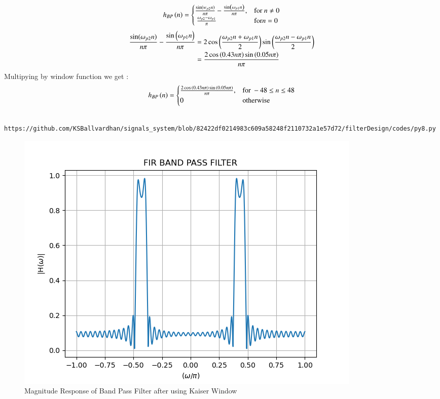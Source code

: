 \documentclass{article}
\begin{document}
	\begin{align}
		h_{BP}\left(n\right) = 
		\begin{cases} 
			\frac{\sin(w_{p2} n)}{n\pi} -\frac{\sin\left(\omega_{p1}n\right)}{n\pi},  & \text{for } n\neq 0\\\
			\frac{\omega_{p2}-\omega_{p1}}{\pi} &\text{for} n= 0
		\end{cases} \label{eq:h(n)desired_for_LPF}
	\end{align}
	\begin{align}
		\frac{\sin(\omega_{p2} n)}{n\pi} -\frac{\sin\left(\omega_{p1}n\right)}{n\pi} &= 2\cos{\ensuremath{\left(\frac{\omega_{p2}n+\omega_{p1}n}{2}\right)}}\sin{\ensuremath{\left(\frac{\omega_{p2}n-\omega_{p1}n}{2}\right)}}\\
		&= \frac{2\cos{\ensuremath{\left(0.43n\pi\right)}}\sin{\ensuremath{\left(0.05n\pi\right)}}}{n\pi}
	\end{align}
	Multipying by window function we get :
	\begin{align}
		h_{BP}\left(n\right) = 
		\begin{cases} 
			\frac{2\cos{\ensuremath{\left(0.43n\pi\right)}}\sin{\ensuremath{\left(0.05n\pi\right)}}}{n\pi},  & \text{for } -48\leq n \leq 48 \\
			0 &\text{otherwise}
		\end{cases} \label{eq:h(n)desired_for_LPF}
	\end{align}
	\begin{lstlisting}
		https://github.com/KSBallvardhan/signals_system/blob/82422df0214983c609a58248f2110732a1e57d72/filterDesign/codes/py8.py
	\end{lstlisting}
	\begin{figure}[htbp]
		\centering
		\includegraphics[width=1\linewidth]{figs/fig8}
		\caption{Magnitude Response of Band Pass Filter after using Kaiser Window}
		\label{fig:Kaiser_BPF_response}
	\end{figure}
\end{document}
